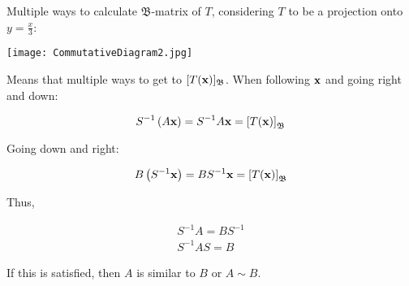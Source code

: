 \noindent
Multiple ways to calculate $\mathfrak{B}$-matrix of $T$, considering $T$ to be a projection
onto $y=\frac{x}{3}$:

\texttt{[image: CommutativeDiagram2.jpg]}

Means that multiple ways to get to $[T(\textbf{x})]_\mathfrak{B}$.
When following $\textbf{x}$ and going right and down:

\[S^{-1}\left(A\textbf x\right)=S^{-1}A\textbf x=\left[T(\textbf x) \right]_\mathfrak{B}\]

Going down and right:

\[B\left(S^{-1}\textbf x\right)=BS^{-1} \textbf x=\left[T(\textbf x )\right]_\mathfrak{B}\]

Thus,

\begin{align*}
S^{-1}A=BS^{-1}\\
\boxed{S^{-1}AS=B}
\end{align*}

If this is satisfied, then $A$ is similar to $B$ or $A\sim B$.